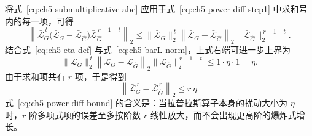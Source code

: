 将式~\eqref{eq:ch5-submultiplicative-abc} 应用于式~\eqref{eq:ch5-power-diff-step1} 中求和号内的每一项，可得
\begin{equation}
  \left\|
  \bar{\mathcal{L}}_G^{\,t}
  \bigl(\bar{\mathcal{L}}_G-\bar{\mathcal{L}}_{\hat G}\bigr)
  \bar{\mathcal{L}}_{\hat G}^{\,r-1-t}
  \right\|_2
  \le
  \|\bar{\mathcal{L}}_G\|_2^{\,t}
  \left\|
  \bar{\mathcal{L}}_G-\bar{\mathcal{L}}_{\hat G}
  \right\|_2
  \|\bar{\mathcal{L}}_{\hat G}\|_2^{\,r-1-t}.
  \label{eq:ch5-power-diff-step2}
\end{equation}
结合式~\eqref{eq:ch5-eta-def} 与式~\eqref{eq:ch5-barL-norm}，上式右端可进一步上界为
\begin{equation}
  \|\bar{\mathcal{L}}_G\|_2^{\,t}
  \left\|
  \bar{\mathcal{L}}_G-\bar{\mathcal{L}}_{\hat G}
  \right\|_2
  \|\bar{\mathcal{L}}_{\hat G}\|_2^{\,r-1-t}
  \le
  1\cdot \eta \cdot 1
  =
  \eta.
  \label{eq:ch5-power-diff-step3}
\end{equation}
由于求和项共有 $r$ 项，于是得到
\begin{equation}
  \left\|
  \bar{\mathcal{L}}_G^{\,r}-\bar{\mathcal{L}}_{\hat G}^{\,r}
  \right\|_2
  \le
  r\,\eta.
  \label{eq:ch5-power-diff-bound}
\end{equation}
式~\eqref{eq:ch5-power-diff-bound} 的含义是：当拉普拉斯算子本身的扰动大小为 $\eta$ 时，$r$ 阶多项式项的误差至多按阶数 $r$ 线性放大，而不会出现更高阶的爆炸式增长。

